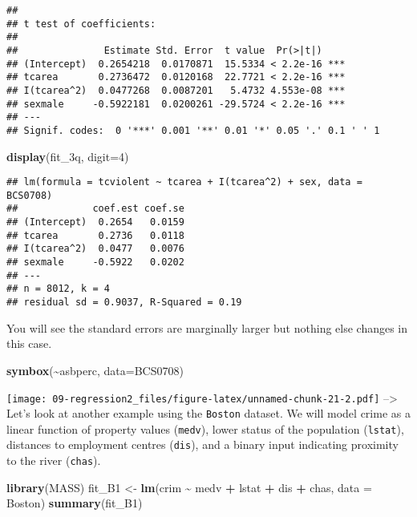 \documentclass[
]{book}
\newenvironment{Shaded}{\begin{snugshade}}{\end{snugshade}}
\newcommand{\AttributeTok}[1]{\textcolor[rgb]{0.13,0.29,0.53}{#1}}
\newcommand{\DecValTok}[1]{\textcolor[rgb]{0.00,0.00,0.81}{#1}}
\newcommand{\FunctionTok}[1]{\textcolor[rgb]{0.13,0.29,0.53}{\textbf{#1}}}
\newcommand{\NormalTok}[1]{#1}
\newcommand{\OtherTok}[1]{\textcolor[rgb]{0.56,0.35,0.01}{#1}}
\newcommand{\SpecialCharTok}[1]{\textcolor[rgb]{0.81,0.36,0.00}{\textbf{#1}}}
\begin{document}
\begin{verbatim}
## 
## t test of coefficients:
## 
##               Estimate Std. Error  t value  Pr(>|t|)    
## (Intercept)  0.2654218  0.0170871  15.5334 < 2.2e-16 ***
## tcarea       0.2736472  0.0120168  22.7721 < 2.2e-16 ***
## I(tcarea^2)  0.0477268  0.0087201   5.4732 4.553e-08 ***
## sexmale     -0.5922181  0.0200261 -29.5724 < 2.2e-16 ***
## ---
## Signif. codes:  0 '***' 0.001 '**' 0.01 '*' 0.05 '.' 0.1 ' ' 1
\end{verbatim}

\begin{Shaded}
\begin{Highlighting}[]
\FunctionTok{display}\NormalTok{(fit\_3q, }\AttributeTok{digit=}\DecValTok{4}\NormalTok{)}
\end{Highlighting}
\end{Shaded}

\begin{verbatim}
## lm(formula = tcviolent ~ tcarea + I(tcarea^2) + sex, data = BCS0708)
##             coef.est coef.se
## (Intercept)  0.2654   0.0159
## tcarea       0.2736   0.0118
## I(tcarea^2)  0.0477   0.0076
## sexmale     -0.5922   0.0202
## ---
## n = 8012, k = 4
## residual sd = 0.9037, R-Squared = 0.19
\end{verbatim}

You will see the standard errors are marginally larger but nothing else changes in this case.

\begin{Shaded}
\begin{Highlighting}[]
\FunctionTok{symbox}\NormalTok{(}\SpecialCharTok{\textasciitilde{}}\NormalTok{asbperc, }\AttributeTok{data=}\NormalTok{BCS0708)}
\end{Highlighting}
\end{Shaded}

\texttt{[image: 09-regression2\_files/figure-latex/unnamed-chunk-21-2.pdf]}
--\textgreater{}
Let's look at another example using the \texttt{Boston} dataset. We will model crime as a linear function of property values (\texttt{medv}), lower status of the population (\texttt{lstat}), distances to employment centres (\texttt{dis}), and a binary input indicating proximity to the river (\texttt{chas}).

\begin{Shaded}
\begin{Highlighting}[]
\FunctionTok{library}\NormalTok{(MASS)}
\NormalTok{fit\_B1 }\OtherTok{\textless{}{-}} \FunctionTok{lm}\NormalTok{(crim }\SpecialCharTok{\textasciitilde{}}\NormalTok{ medv }\SpecialCharTok{+}\NormalTok{ lstat }\SpecialCharTok{+}\NormalTok{ dis }\SpecialCharTok{+}\NormalTok{ chas, }\AttributeTok{data =}\NormalTok{ Boston)}
\FunctionTok{summary}\NormalTok{(fit\_B1)}
\end{Highlighting}
\end{Shaded}
\end{document}
